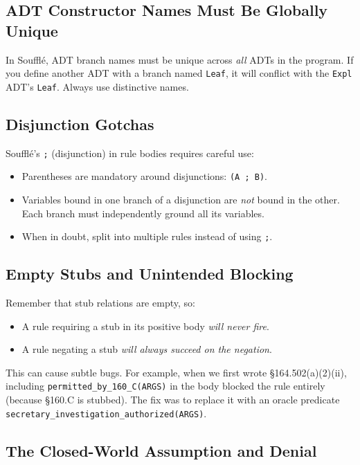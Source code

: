 \documentclass[11pt,letterpaper]{article}
\begin{document}
\subsection{ADT Constructor Names Must Be Globally Unique}

In Souffl\'{e}, ADT branch names must be unique across \emph{all} ADTs in the program. If you define another ADT with a branch named \texttt{Leaf}, it will conflict with the \texttt{Expl} ADT's \texttt{Leaf}. Always use distinctive names.

\subsection{Disjunction Gotchas}

Souffl\'{e}'s \texttt{;} (disjunction) in rule bodies requires careful use:
\begin{itemize}
  \item Parentheses are mandatory around disjunctions: \texttt{(A ; B)}.
  \item Variables bound in one branch of a disjunction are \emph{not} bound in the other. Each branch must independently ground all its variables.
  \item When in doubt, split into multiple rules instead of using \texttt{;}.
\end{itemize}

\subsection{Empty Stubs and Unintended Blocking}

Remember that stub relations are empty, so:
\begin{itemize}
  \item A rule requiring a stub in its positive body \emph{will never fire}.
  \item A rule negating a stub \emph{will always succeed on the negation}.
\end{itemize}

This can cause subtle bugs. For example, when we first wrote \S 164.502(a)(2)(ii), including \texttt{permitted\_by\_160\_C(ARGS)} in the body blocked the rule entirely (because \S 160.C is stubbed). The fix was to replace it with an oracle predicate \texttt{secretary\_investigation\_authorized(ARGS)}.

\subsection{The Closed-World Assumption and Denial}
\end{document}
